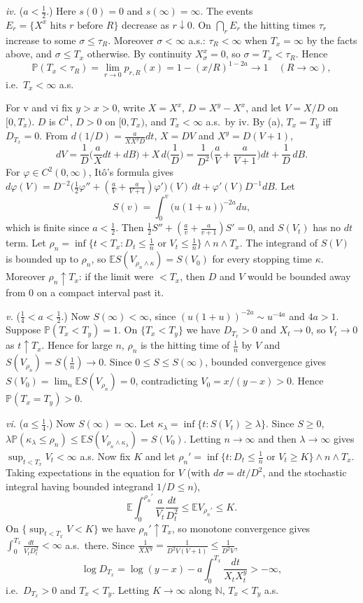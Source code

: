 \documentclass[11pt,a4paper]{article}
\newcommand{\E}{\mathbb{E}}
\renewcommand{\P}{\mathbb{P}}
\newcommand{\N}{\mathbb{N}}
\newcommand{\1}{\mathbf{1}}
\begin{document}
\emph{iv.} ($a<\frac12$.) Here $s(0)=0$ and $s(\infty)=\infty$. The events $E_r=\{X^x\text{ hits }r\text{ before }R\}$ decrease as $r\downarrow0$.
On $\bigcap_rE_r$ the hitting times $\tau_r$ increase to some $\sigma\le\tau_R$. Moreover $\sigma<\infty$ a.s.: $\tau_R<\infty$ when $T_x=\infty$ by
the facts above, and $\sigma\le T_x$ otherwise. By continuity $X^x_{\sigma}=0$, so $\sigma=T_x<\tau_R$. Hence
\[\P(T_x<\tau_R)=\lim_{r\to0}p_{r,R}(x)=1-(x/R)^{1-2a}\to1\quad(R\to\infty),\]
i.e.\ $T_x<\infty$ a.s.

For v and vi fix $y>x>0$, write $X=X^x$, $D=X^y-X^x$, and let $V=X/D$ on $[0,T_x)$. $D$ is $C^1$, $D>0$ on $[0,T_x)$, and
$T_x<\infty$ a.s.\ by iv. By (a), $T_x=T_y$ iff $D_{T_x}=0$. From $d(1/D)=\frac{a}{XX^yD}dt$, $X=DV$ and $X^y=D(V+1)$,
\[
dV=\frac1D\Big(\frac aXdt+dB\Big)+X\,d\Big(\frac1D\Big)
=\frac{1}{D^2}\Big(\frac aV+\frac a{V+1}\Big)dt+\frac1D\,dB .
\]
For $\varphi\in C^2(0,\infty)$, Itô's formula gives
$d\varphi(V)=D^{-2}\big(\tfrac12\varphi''+(\tfrac aV+\tfrac a{V+1})\varphi'\big)(V)\,dt+\varphi'(V)D^{-1}dB$. Let
\[
S(v)=\int_0^v\big(u(1+u)\big)^{-2a}du,
\]
which is finite since $a<\frac12$. Then $\frac12S''+(\frac av+\frac a{v+1})S'=0$, and $S(V_t)$ has no $dt$ term.
Let $\rho_n=\inf\{t<T_x:D_t\le\frac1n\text{ or }V_t\le\frac1n\}\wedge n\wedge T_x$. The integrand of $S(V)$ is bounded up
to $\rho_n$, so $\E S(V_{\rho_n\wedge\kappa})=S(V_0)$ for every stopping time $\kappa$. Moreover $\rho_n\uparrow T_x$:
if the limit were $<T_x$, then $D$ and $V$ would be bounded away from $0$ on a compact interval past it.

\emph{v.} ($\frac14<a<\frac12$.) Now $S(\infty)<\infty$, since $(u(1+u))^{-2a}\sim u^{-4a}$ and $4a>1$. Suppose $\P(T_x<T_y)=1$.
On $\{T_x<T_y\}$ we have $D_{T_x}>0$ and $X_t\to0$, so $V_t\to0$ as $t\uparrow T_x$. Hence for large $n$, $\rho_n$ is the hitting
time of $\frac1n$ by $V$ and $S(V_{\rho_n})=S(\frac1n)\to0$. Since $0\le S\le S(\infty)$, bounded convergence gives
$S(V_0)=\lim_n\E S(V_{\rho_n})=0$, contradicting $V_0=x/(y-x)>0$. Hence $\P(T_x=T_y)>0$.

\emph{vi.} ($a\le\frac14$.) Now $S(\infty)=\infty$. Let $\kappa_\lambda=\inf\{t:S(V_t)\ge\lambda\}$. Since $S\ge0$,
$\lambda\P(\kappa_\lambda\le\rho_n)\le\E S(V_{\rho_n\wedge\kappa_\lambda})=S(V_0)$. Letting $n\to\infty$ and then $\lambda\to\infty$ gives
$\sup_{t<T_x}V_t<\infty$ a.s. Now fix $K$ and let $\rho_n'=\inf\{t:D_t\le\frac1n\text{ or }V_t\ge K\}\wedge n\wedge T_x$. Taking
expectations in the equation for $V$ (with $d\sigma=dt/D^2$, and the stochastic integral having bounded integrand $1/D\le n$),
\[
\E\int_0^{\rho_n'}\frac{a}{V_t}\frac{dt}{D_t^2}\le\E V_{\rho_n'}\le K .
\]
On $\{\sup_{t<T_x}V<K\}$ we have $\rho_n'\uparrow T_x$, so monotone convergence gives
$\int_0^{T_x}\frac{dt}{V_tD_t^2}<\infty$ a.s.\ there. Since $\frac{1}{XX^y}=\frac{1}{D^2V(V+1)}\le\frac{1}{D^2V}$,
\[\log D_{T_x}=\log(y-x)-a\int_0^{T_x}\frac{dt}{X_tX^y_t}>-\infty,\]
i.e.\ $D_{T_x}>0$ and $T_x<T_y$. Letting $K\to\infty$ along $\N$, $T_x<T_y$ a.s.
\end{document}
